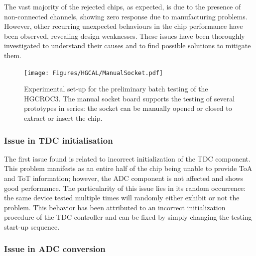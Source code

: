 The vast majority of the rejected chips, as expected, is due to the presence of non-connected channels, showing zero response due to manufacturing problems. 
However, other recurring unexpected behaviours in the chip performance have been observed, revealing design weaknesses. These issues have been thoroughly investigated to understand their causes and to find possible solutions to mitigate them. 

\begin{figure}[b!]
    \centering
    \texttt{[image: Figures/HGCAL/ManualSocket.pdf]}
    \caption{Experimental set-up for the preliminary batch testing of the HGCROC3. The manual socket board supports the testing of several prototypes in series: the socket can be manually opened or closed to extract or insert the chip.}
    \label{fig:ManualSocket}
\end{figure}

\subsubsection{Issue in TDC initialisation}
\label{subsubsec:Issue in TDC initialisation}

The first issue found is related to incorrect initialization of the TDC component. This problem manifests as an entire half of the chip being unable to provide ToA and ToT information; however, the ADC component is not affected and shows good performance. The particularity of this issue lies in its random occurrence: the same device tested multiple times will randomly either exhibit or not the problem. This behavior has been attributed to an incorrect initialization procedure of the TDC controller and can be fixed by simply changing the testing start-up sequence.

\subsubsection{Issue in ADC conversion}
\label{subsubsec:Issue in ADC conversion}

